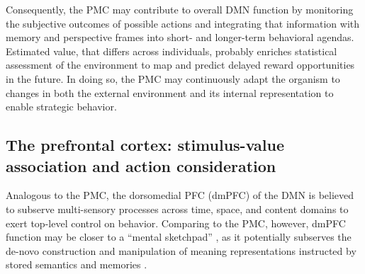 \documentclass[10pt,letterpaper]{article}
\begin{document}
Consequently, the PMC may contribute to overall DMN function
by monitoring the subjective outcomes
of possible actions and integrating that information
with memory and perspective frames
into short- and longer-term behavioral agendas.
Estimated value, that differs across individuals, probably enriches
statistical assessment of the environment
to map and predict delayed reward opportunities in the future.
In doing so, the PMC may continuously adapt the organism to changes
in both the external environment and its internal representation
to enable strategic behavior.


\subsection{The prefrontal cortex: stimulus-value association and action consideration}
Analogous to the PMC,
the dorsomedial PFC (dmPFC) of the DMN is believed to subserve
multi-sensory processes
across time, space, and content domains to
exert top-level control on behavior.
Comparing to the PMC, however,
dmPFC function may be closer to a
``mental sketchpad'' \citep{goldman1996prefrontal}, as it
potentially subserves the de-novo construction and manipulation
of meaning representations instructed by stored semantics and memories
\citep{bzdok2013segregation}.
\end{document}
